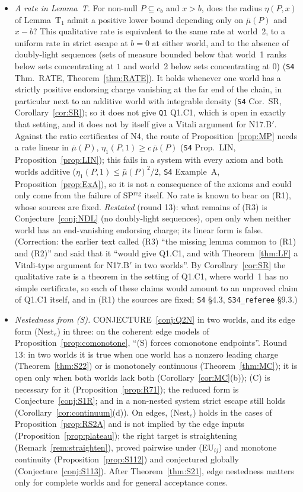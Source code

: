 \documentclass[11pt]{article}
\theoremstyle{definition}
\theoremstyle{remark}
\newcommand{\src}[1]{\texttt{#1}}
\begin{document}
\begin{itemize}[leftmargin=*]
\item[\textbf{(R3)}] \emph{A rate in Lemma~T.} For non-null $P\subseteq c_b$ and $x>b$, does the radius $\eta(P,x)$ of Lemma~T$_1$ admit a positive lower bound depending only on $\bar\mu(P)$ and $x-b$? This qualitative rate is equivalent to the same rate at world~2, to a uniform rate in strict escape at $b=0$ at either world, and to the absence of doubly-light sequences (sets of measure bounded below that world~1 ranks below sets concentrating at $1$ and world~2 below sets concentrating at $0$) (\src{S4} Thm.~RATE, Theorem~\ref{thm:RATE}). It holds whenever one world has a strictly positive endorsing charge vanishing at the far end of the chain, in particular next to an additive world with integrable density (\src{S4} Cor.~SR, Corollary~\ref{cor:SR}); so it does not give \src{Q1} Q1.C1, which is open in exactly that setting, and it does not by itself give a Vitali argument for N17.B$'$. Against the ratio certificates of N4, the route of Proposition~\ref{prop:MP} needs a rate linear in $\bar\mu(P)$, $\eta_1(P,1)\ge c\,\bar\mu(P)$ (\src{S4} Prop.~LIN, Proposition~\ref{prop:LIN}); this fails in a system with every axiom and both worlds additive ($\eta_1(P,1)\le\bar\mu(P)^2/2$, \src{S4} Example~A, Proposition~\ref{prop:ExA}), so it is not a consequence of the axioms and could only come from the failure of SP$^{\mathrm{reg}}$ itself. No rate is known to bear on (R1), whose sources are fixed. \emph{Restated} (round 13): what remains of (R3) is Conjecture~\ref{conj:NDL} (no doubly-light sequences), open only when neither world has an end-vanishing endorsing charge; its linear form is false. (Correction: the earlier text called (R3) ``the missing lemma common to (R1) and (R2)'' and said that it ``would give Q1.C1, and with Theorem~\ref{thm:LF} a Vitali-type argument for N17.B$'$ in two worlds''. By Corollary~\ref{cor:SR} the qualitative rate is a theorem in the setting of Q1.C1, where world~1 has no simple certificate, so each of these claims would amount to an unproved claim of Q1.C1 itself, and in (R1) the sources are fixed; \src{S4} \S4.3, \src{S34\_referee} \S9.3.)
\item[\textbf{(R4)}] \emph{Nestedness from (S).} CONJECTURE~\ref{conj:Q2N} in two worlds, and its edge form (Nest$_e$) in three: on the coherent edge models of Proposition~\ref{prop:comonotone}, ``(S) forces comonotone endpoints''. Round 13: in two worlds it is true when one world has a nonzero leading charge (Theorem~\ref{thm:S22}) or is monotonely continuous (Theorem~\ref{thm:MC}); it is open only when both worlds lack both (Corollary~\ref{cor:MC}(b)); (C) is necessary for it (Proposition~\ref{prop:R71}); the reduced form is Conjecture~\ref{conj:S1R}; and in a non-nested system strict escape still holds (Corollary~\ref{cor:continuum}(d)). On edges, (Nest$_e$) holds in the cases of Proposition~\ref{prop:RS2A} and is not implied by the edge inputs (Proposition~\ref{prop:plateau}); the right target is straightening (Remark~\ref{rem:straighten}), proved pairwise under (EU$_{ij}$) and monotone continuity (Proposition~\ref{prop:S112}) and conjectured globally (Conjecture~\ref{conj:S113}). After Theorem~\ref{thm:S21}, edge nestedness matters only for complete worlds and for general acceptance cones.
\end{itemize}
\end{document}
